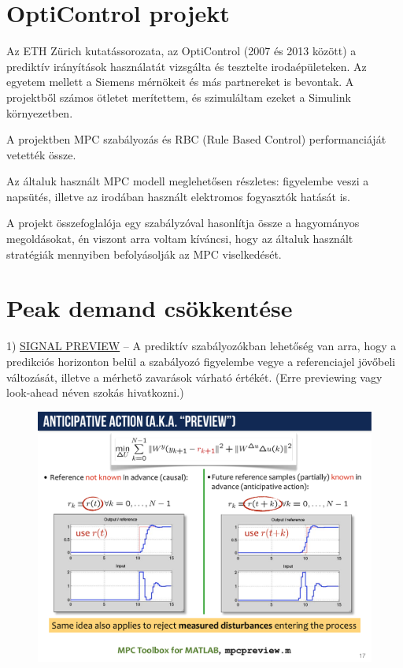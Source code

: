 \section{OptiControl projekt}
Az ETH Zürich kutatássorozata, az OptiControl \cite{Opticontrol-II} (2007 és 2013 között) a prediktív irányítások használatát vizsgálta és tesztelte irodaépületeken. Az egyetem mellett a Siemens mérnökeit és más partnereket is bevontak. A projektből számos ötletet merítettem, és szimuláltam ezeket a Simulink környezetben.


A projektben MPC szabályozás és RBC (Rule Based Control) performanciáját vetették össze.

Az általuk használt MPC modell meglehetősen részletes: figyelembe veszi a napsütés, illetve az irodában használt elektromos fogyasztók hatását is.

A projekt összefoglalója egy szabályzóval hasonlítja össze a hagyományos megoldásokat, én viszont arra voltam kíváncsi, hogy az általuk használt stratégiák mennyiben befolyásolják az MPC viselkedését.



\section{Peak demand csökkentése}

{\large 1) \underline{SIGNAL PREVIEW} -- }A prediktív szabályozókban lehetőség van arra, hogy a predikciós horizonton belül a szabályozó figyelembe vegye a referenciajel jövőbeli változását, illetve a mérhető zavarások várható értékét. (Erre previewing vagy look-ahead néven szokás hivatkozni.)


\begin{figure}[H]
	\centering
	\includegraphics[trim=10 50 10 0, clip,width=\textwidth]{figures/onlab/preview}
	\label{fig:preview-bemporad}
\end{figure}

